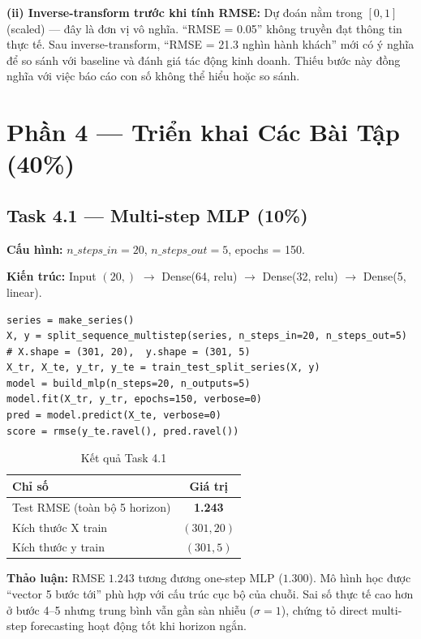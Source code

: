\documentclass[12pt,a4paper]{article}
\begin{document}
\textbf{(ii) Inverse-transform trước khi tính RMSE:}
Dự đoán nằm trong $[0, 1]$ (scaled) --- đây là đơn vị vô nghĩa. ``RMSE = 0.05'' không truyền đạt thông tin thực tế. Sau inverse-transform, ``RMSE = 21.3 nghìn hành khách'' mới có ý nghĩa để so sánh với baseline và đánh giá tác động kinh doanh. Thiếu bước này đồng nghĩa với việc báo cáo con số không thể hiểu hoặc so sánh.

\section{Phần 4 --- Triển khai Các Bài Tập (40\%)}

\subsection{Task 4.1 --- Multi-step MLP (10\%)}

\textbf{Cấu hình:} $n\_steps\_in = 20$, $n\_steps\_out = 5$, epochs = 150.

\textbf{Kiến trúc:} Input $(20,)$ $\to$ Dense(64, relu) $\to$ Dense(32, relu) $\to$ Dense(5, linear).

\begin{lstlisting}[caption=Triển khai Exercise 1]
series = make_series()
X, y = split_sequence_multistep(series, n_steps_in=20, n_steps_out=5)
# X.shape = (301, 20),  y.shape = (301, 5)
X_tr, X_te, y_tr, y_te = train_test_split_series(X, y)
model = build_mlp(n_steps=20, n_outputs=5)
model.fit(X_tr, y_tr, epochs=150, verbose=0)
pred = model.predict(X_te, verbose=0)
score = rmse(y_te.ravel(), pred.ravel())
\end{lstlisting}

\begin{table}[H]
\centering
\caption{Kết quả Task 4.1}
\begin{tabular}{lc}
\toprule
\textbf{Chỉ số} & \textbf{Giá trị} \\
\midrule
Test RMSE (toàn bộ 5 horizon) & \textbf{1.243} \\
Kích thước X train & $(301, 20)$ \\
Kích thước y train & $(301, 5)$ \\
\bottomrule
\end{tabular}
\end{table}

\textbf{Thảo luận:} RMSE $1.243$ tương đương one-step MLP ($1.300$). Mô hình học được ``vector 5 bước tới'' phù hợp với cấu trúc cục bộ của chuỗi. Sai số thực tế cao hơn ở bước 4--5 nhưng trung bình vẫn gần sàn nhiễu ($\sigma=1$), chứng tỏ direct multi-step forecasting hoạt động tốt khi horizon ngắn.
\end{document}
